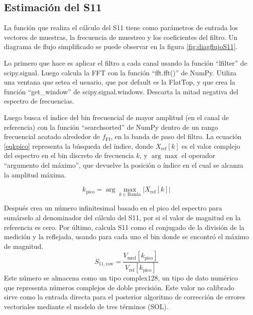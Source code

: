 \subsection{Estimación del S11}
\label{sec:estS11}

La función que realiza el cálculo del S11 tiene como parámetros de entrada los vectores de muestras, la frecuencia de muestreo y los coeficientes del filtro. Un diagrama de flujo simplificado se puede observar en la figura \ref{fig:diagflujoS11}. 

Lo primero que hace es aplicar el filtro a cada canal usando la función ``lfilter'' de scipy.signal. Luego calcula la FFT con la función ``fft.fft()'' de NumPy. Utiliza una ventana que setea el usuario, que por default es la FlatTop, y que crea la función ``get\_window'' de scipy.signal.windows. Descarta la mitad negativa del espectro de frecuencias.

Luego busca el índice del bin frecuencial de mayor amplitud (en el canal de referencia) con la función ``searchsorted'' de NumPy dentro de un rango frecuencial acotado alrededor de $f_{\text{FI}}$, en la banda de paso del filtro. La ecuación \ref{eqkpico} representa la búsqueda del índice, donde $X_{\text{ref}}[k]$ es el valor complejo del espectro en el bin discreto de frecuencia $k$, y $\arg\max$ el operador ``argumento del máximo'', que devuelve la posición o índice en el cual se alcanza la amplitud máxima.  

\begin{equation}
    k_{\text{pico}} = \arg\max_{k \in \text{Banda}} \left| X_{\text{ref}}[k] \right|
    \label{eqkpico}
\end{equation}

Después crea un número infinitesimal basado en el pico del espectro para sumárselo al denominador del cálculo del S11, por si el valor de magnitud en la referencia es cero. Por último, calcula S11 como el conjugado de la división de la medición y la reflejada, usando para cada uno el bin donde se encontró el máximo de magnitud.
\begin{equation}
    S_{11,\text{raw}} = \frac{V_{\text{med}}[k_{\text{pico}}]}{V_{\text{ref}}[k_{\text{pico}}]}
\end{equation}
Este número se almacena como un tipo complex128, un tipo de dato numérico que representa números complejos de doble precisión. Este valor no calibrado sirve como la entrada directa para el posterior algoritmo de corrección de errores vectoriales mediante el modelo de tres términos (SOL).

